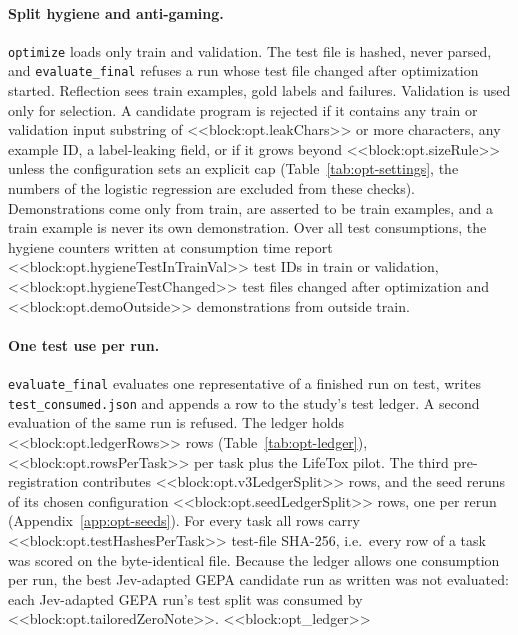 \paragraph{Split hygiene and anti-gaming.}
\texttt{optimize} loads only train and validation. The test file is hashed, never parsed, and \texttt{evaluate\_final} refuses a run whose test file changed after optimization started. Reflection sees train examples, gold labels and failures. Validation is used only for selection. A candidate program is rejected if it contains any train or validation input substring of <<block:opt.leakChars>> or more characters, any example ID, a label-leaking field, or if it grows beyond <<block:opt.sizeRule>> unless the configuration sets an explicit cap (Table~\ref{tab:opt-settings}, the numbers of the logistic regression are excluded from these checks). Demonstrations come only from train, are asserted to be train examples, and a train example is never its own demonstration. Over all test consumptions, the hygiene counters written at consumption time report <<block:opt.hygieneTestInTrainVal>> test IDs in train or validation, <<block:opt.hygieneTestChanged>> test files changed after optimization and <<block:opt.demoOutside>> demonstrations from outside train.

\paragraph{One test use per run.}
\texttt{evaluate\_final} evaluates one representative of a finished run on test, writes \texttt{test\_consumed.json} and appends a row to the study's test ledger. A second evaluation of the same run is refused. The ledger holds <<block:opt.ledgerRows>> rows (Table~\ref{tab:opt-ledger}), <<block:opt.rowsPerTask>> per task plus the LifeTox pilot. The third pre-registration contributes <<block:opt.v3LedgerSplit>> rows, and the seed reruns of its chosen configuration <<block:opt.seedLedgerSplit>> rows, one per rerun (Appendix~\ref{app:opt-seeds}). For every task all rows carry <<block:opt.testHashesPerTask>> test-file SHA-256, i.e.\ every row of a task was scored on the byte-identical file. Because the ledger allows one consumption per run, the best Jev-adapted GEPA candidate run as written was not evaluated: each Jev-adapted GEPA run's test split was consumed by <<block:opt.tailoredZeroNote>>.
<<block:opt_ledger>>

